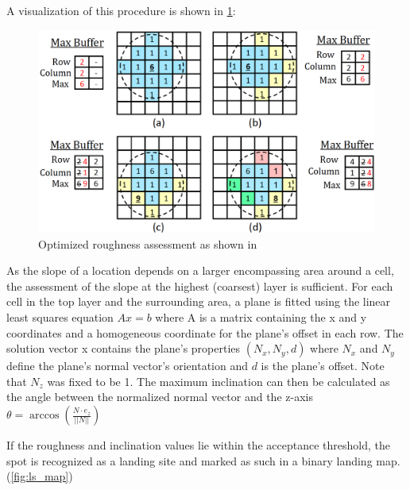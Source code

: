 A visualization of this procedure is shown in \cref{fig:lsd_roughness_check}:
\clearpage %

\begin{figure}[ht!]
    \centering
    \includegraphics[scale=0.5]{images/system_overview/roughness_check.png}
    \caption{Optimized roughness assessment as shown in \citet{LSD2}}
    \label{fig:lsd_roughness_check}
\end{figure}

As the slope of a location depends on a larger encompassing area around a cell, the assessment of the slope at the highest (coarsest) layer is sufficient. For each cell in the top layer and the surrounding area, a plane is fitted using the linear least squares equation $Ax = b$ where A is a matrix containing the x and y coordinates and a homogeneous coordinate for the plane's offset in each row. The solution vector x contains the plane's properties $\left(N_x, N_y, d\right)$ where $N_x$ and $N_y$ define the plane's normal vector's orientation and $d$ is the plane's offset. Note that $N_z$ was fixed to be 1. The maximum inclination can then be calculated as the angle between the normalized normal vector and the z-axis $\theta = \arccos\left(\frac{N \cdot e_z}{||N||}\right)$

If the roughness and inclination values lie within the acceptance threshold, the spot is recognized as a landing site and marked as such in a binary landing map.(\ref{fig:ls_map})

